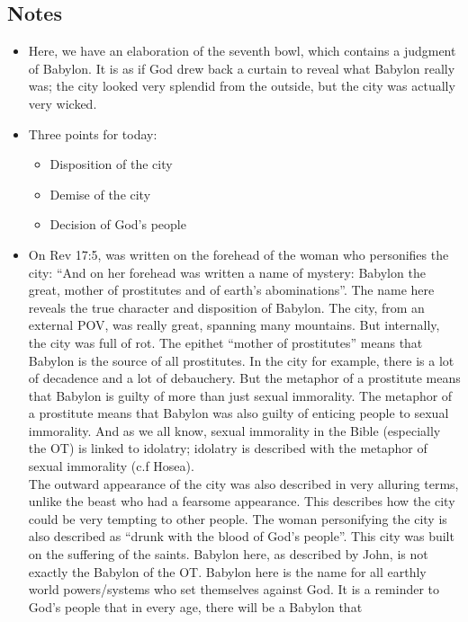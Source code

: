 \subsection*{Notes}
\begin{itemize}
  \item{Here, we have an elaboration of the seventh bowl, which contains a
  judgment of Babylon.  It is as if God drew back a curtain to reveal what
  Babylon really was; the city looked very splendid from the outside, but the
  city was actually very wicked.}
  \item{Three points for today:
  \begin{itemize}
    \item{Disposition of the city}
    \item{Demise of the city}
    \item{Decision of God's people}
  \end{itemize}}
  \item{On Rev 17:5, was written on the forehead of the woman who personifies
  the city: ``And on her forehead was written a name of mystery: Babylon the
  great, mother of prostitutes and of earth's abominations''.  The name here
  reveals the true character and disposition of Babylon.  The city, from an
  external POV, was really great, spanning many mountains.  But internally,
  the city was full of rot.  The epithet ``mother of prostitutes'' means that
  Babylon is the source of all prostitutes.  In the city for example, there
  is a lot of decadence and a lot of debauchery.  But the metaphor of a
  prostitute means that Babylon is guilty of more than just sexual
  immorality.  The metaphor of a prostitute means that Babylon was also
  guilty of enticing people to sexual immorality.  And as we all know, sexual
  immorality in the Bible (especially the OT) is linked to idolatry; idolatry
  is described with the metaphor of sexual immorality (c.f Hosea).  \\ The
  outward appearance of the city was also described in very alluring terms,
  unlike the beast who had a fearsome appearance.  This describes how the
  city could be very tempting to other people.  The woman personifying the
  city is also described as ``drunk with the blood of God's people''.  This
  city was built on the suffering of the saints.  Babylon here, as described
  by John, is not exactly the Babylon of the OT.  Babylon here is the name
  for all earthly world powers/systems who set themselves against God.  It is
  a reminder to God's people that in every age, there will be a Babylon that
}
\end{itemize}
